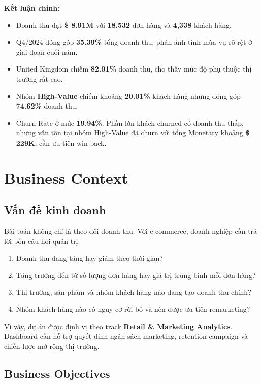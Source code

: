 \documentclass[11pt,a4paper]{article}
\begin{document}
\textbf{Kết luận chính:}
\begin{itemize}
    \item Doanh thu đạt \textbf{\$ 8.91M} với \textbf{18,532} đơn hàng và \textbf{4,338} khách hàng.
    \item Q4/2024 đóng góp \textbf{35.39\%} tổng doanh thu, phản ánh tính mùa vụ rõ rệt ở giai đoạn cuối năm.
    \item United Kingdom chiếm \textbf{82.01\%} doanh thu, cho thấy mức độ phụ thuộc thị trường rất cao.
    \item Nhóm \textbf{High-Value} chiếm khoảng \textbf{20.01\%} khách hàng nhưng đóng góp \textbf{74.62\%} doanh thu.
    \item Churn Rate ở mức \textbf{19.94\%}. Phần lớn khách churned có doanh thu thấp, nhưng vẫn tồn tại nhóm High-Value đã churn với tổng Monetary khoảng \textbf{\$ 229K}, cần ưu tiên win-back.
\end{itemize}

\section{Business Context}

\subsection{Vấn đề kinh doanh}

Bài toán không chỉ là theo dõi doanh thu. Với e-commerce, doanh nghiệp cần trả lời bốn câu hỏi quản trị:

\begin{enumerate}
    \item Doanh thu đang tăng hay giảm theo thời gian?
    \item Tăng trưởng đến từ số lượng đơn hàng hay giá trị trung bình mỗi đơn hàng?
    \item Thị trường, sản phẩm và nhóm khách hàng nào đang tạo doanh thu chính?
    \item Nhóm khách hàng nào có nguy cơ rời bỏ và nên được ưu tiên remarketing?
\end{enumerate}

Vì vậy, dự án được định vị theo track \textbf{Retail \& Marketing Analytics}. Dashboard cần hỗ trợ quyết định ngân sách marketing, retention campaign và chiến lược mở rộng thị trường.

\subsection{Business Objectives}
\end{document}
